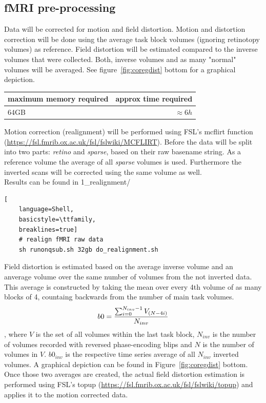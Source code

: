 \documentclass[12pt,a4paper]{scrartcl}
\begin{document}
\subsection{fMRI pre-processing}
Data will be corrected for motion and field distortion. Motion and distortion correction will be done using the average task block volumes (ignoring retinotopy volumes) as reference. Field distortion will be estimated compared to the inverse volumes that were collected. Both, inverse volumes and as many "normal" volumes will be averaged. See figure~\ref{fig:coregdist} bottom for a graphical depiction.
\begin{table}[h]
\begin{tabular}{l | r}
\toprule
maximum memory required & approx time required\\\toprule
64GB & $\approx 6h$ \\\bottomrule
\end{tabular}
\end{table}
Motion correction (realignment) will be performed using FSL's mcflirt function (\href{https://fsl.fmrib.ox.ac.uk/fsl/fslwiki/MCFLIRT}{https://fsl.fmrib.ox.ac.uk/fsl/fslwiki/MCFLIRT}). Before the data will be split into two parts: \textit{retino} and  \textit{sparse}, based on their raw basename string. As a reference volume the average of all \textit{sparse} volumes is used. Furthermore the inverted scans will be corrected using the same volume as well.\\
Results can be found in 1\_realignment/
\begin{lstlisting}[
    language=Shell,
    basicstyle=\ttfamily,
    breaklines=true]
    # realign fMRI raw data
    sh runonqsub.sh 32gb do_realignment.sh
\end{lstlisting}
Field distortion is estimated based on the average inverse volume and an anverage volume over the same number of volumes from the not inverted data. This average is constructed by taking the mean over every 4th volume of as many blocks of 4, countaing backwards from the number of main task volumes.
\begin{equation}
\centering
b0=\frac{\sum_{i=0}^{N_{inv}-1}V_{(N-4i)}}{N_{inv}}
\end{equation}
\noindent, where $V$ is the set of all volumes within the last task block, $N_{inv}$ is the number of volumes recorded with reversed phase-encoding blips and $N$ is the number of volumes in $V$. $b0_{inv}$ is the respective time series average of all $N_{inv}$ inverted volumes. A graphical depiction can be found in Figure~\ref{fig:coregdist} bottom. Once those two averages are created, the actual field distortion estimation is performed using FSL's topup (\href{https://fsl.fmrib.ox.ac.uk/fsl/fslwiki/topup}{https://fsl.fmrib.ox.ac.uk/fsl/fslwiki/topup}) and applies it to the motion corrected data.\\
\end{document}
